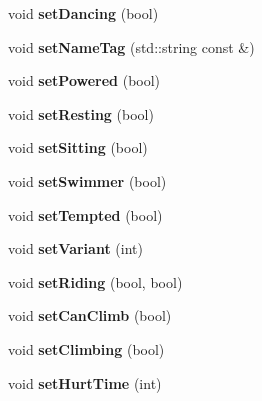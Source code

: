 \begin{DoxyCompactItemize}
\mbox{\label{struct_actor_a2bac8300a81d4b531a4d8c14a8323099}} 
void {\bfseries set\+Dancing} (bool)
\item 
\mbox{\label{struct_actor_a096c140f765cad53416922c2a4128973}} 
void {\bfseries set\+Name\+Tag} (std\+::string const \&)
\item 
\mbox{\label{struct_actor_aa644f282fdc149b78b675996c857a5c8}} 
void {\bfseries set\+Powered} (bool)
\item 
\mbox{\label{struct_actor_acd8abc9482b2c749d3026c0f50b01fac}} 
void {\bfseries set\+Resting} (bool)
\item 
\mbox{\label{struct_actor_a727a3aab607f910aa1ad6e5d2e9d417c}} 
void {\bfseries set\+Sitting} (bool)
\item 
\mbox{\label{struct_actor_ac9b8cab95f3e368f23e75e5514469d0e}} 
void {\bfseries set\+Swimmer} (bool)
\item 
\mbox{\label{struct_actor_ac2678a05f03e4f5104a849f982141f66}} 
void {\bfseries set\+Tempted} (bool)
\item 
\mbox{\label{struct_actor_a89e544f1be4e1b89c9812aeffef2c01c}} 
void {\bfseries set\+Variant} (int)
\item 
\mbox{\label{struct_actor_ab960081b64ffd260b3cbc88d726a7c8b}} 
void {\bfseries set\+Riding} (bool, bool)
\item 
\mbox{\label{struct_actor_a1ded5cb938778228ef796e8af66b87d1}} 
void {\bfseries set\+Can\+Climb} (bool)
\item 
\mbox{\label{struct_actor_a6fa9a942c6ac47e663197f24cecee5a4}} 
void {\bfseries set\+Climbing} (bool)
\item 
\mbox{\label{struct_actor_a54f6008979b177f5e9d337fae524c301}} 
void {\bfseries set\+Hurt\+Time} (int)
\item 
\mbox{\label{struct_actor_a828efc50ff30eea71dcad95986311120}} 

\end{DoxyCompactItemize}
